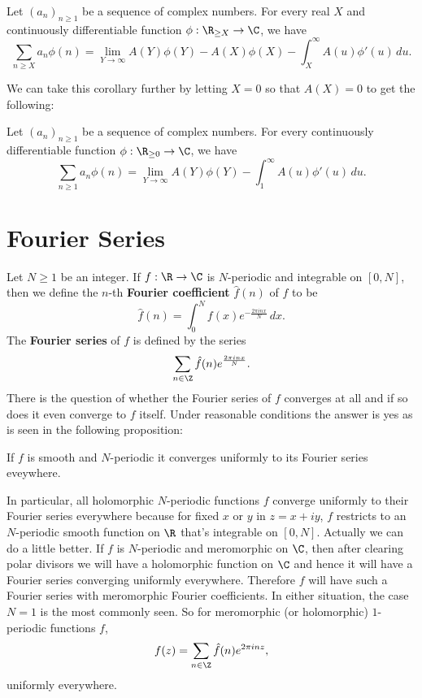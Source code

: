     \begin{corollary}\label{cor:Abels_summation_formula_limit_version}
      Let $(a_{n})_{n \ge 1}$ be a sequence of complex numbers. For every real $X$ and continuously differentiable function $\phi:\R_{\ge X} \to \C$, we have
      \[
        \sum_{n \ge X}a_{n}\phi(n) = \lim_{Y \to \infty}A(Y)\phi(Y)-A(X)\phi(X)-\int_{X}^{\infty}A(u)\phi'(u)\,du.
      \]
    \end{corollary}

    We can take this corollary further by letting $X = 0$ so that $A(X) = 0$ to get the following:

    \begin{corollary}\label{cor:Abels_summation_formula_limit_version_specialization}
      Let $(a_{n})_{n \ge 1}$ be a sequence of complex numbers. For every continuously differentiable function $\phi:\R_{\ge 0} \to \C$, we have
      \[
        \sum_{n \ge 1}a_{n}\phi(n) = \lim_{Y \to \infty}A(Y)\phi(Y)-\int_{1}^{\infty}A(u)\phi'(u)\,du.
      \]
    \end{corollary}
  \section{Fourier Series}\label{append:Fourier_Series}
    Let $N \ge 1$ be an integer. If $f:\R \to \C$ is $N$-periodic and integrable on $[0,N]$, then we define the $n$-th \textbf{Fourier coefficient} $\hat{f}(n)$ of $f$ to be
    \[
      \hat{f}(n) = \int_{0}^{N}f(x)e^{-\frac{2\pi inx}{N}}\,dx.
    \]
    The \textbf{Fourier series} of $f$ is defined by the series
    \[
      \sum_{n \in \Z}\hat{f}(n)e^{\frac{2\pi inx}{N}}.
    \]
    There is the question of whether the Fourier series of $f$ converges at all and if so does it even converge to $f$ itself. Under reasonable conditions the answer is yes as is seen in the following proposition:

    \begin{proposition}
      If $f$ is smooth and $N$-periodic it converges uniformly to its Fourier series eveywhere.
    \end{proposition}

    In particular, all holomorphic $N$-periodic functions $f$ converge uniformly to their Fourier series everywhere because for fixed $x$ or $y$ in $z = x+iy$, $f$ restricts to an $N$-periodic smooth function on $\R$ that's integrable on $[0,N]$. Actually we can do a little better. If $f$ is $N$-periodic and meromorphic on $\C$, then after clearing polar divisors we will have a holomorphic function on $\C$ and hence it will have a Fourier series converging uniformly everywhere. Therefore $f$ will have such a Fourier series with meromorphic Fourier coefficients. In either situation, the case $N = 1$ is the most commonly seen. So for meromorphic (or holomorphic) $1$-periodic functions $f$,
    \[
      f(z) = \sum_{n \in \Z}\hat{f}(n)e^{2\pi inz},
    \]
    uniformly everywhere.
